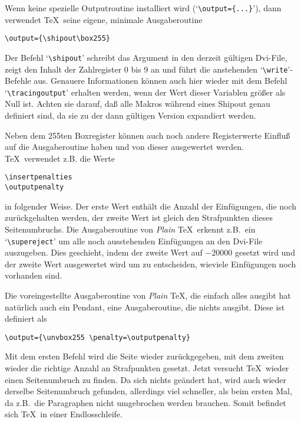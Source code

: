 Wenn keine spezielle Outputroutine installiert wird
(`\verb|\output={...}|'), dann verwendet \TeX\ seine eigene, minimale
Ausgaberoutine
\begin{verbatim}
\output={\shipout\box255}
\end{verbatim}
Der Befehl `\verb|\shipout|' schreibt das 
Argument in den derzeit
g\"ultigen Dvi-File, zeigt den Inhalt der Zahlregister 0 bis 9 an und
f\"uhrt die anstehenden
`\verb|\write|'-Befehle aus. Genauere
Informationen k\"onnen auch hier wieder mit dem Befehl
`\verb|\tracingoutput|' erhalten werden, wenn der Wert dieser
Variablen gr\"o\ss{}er als Null ist. Achten sie darauf, da\ss{} alle Makros
w\"ahrend eines Shipout genau definiert sind, da sie zu der dann
g\"ultigen Version expandiert werden.

Neben dem 255ten Boxregister k\"onnen auch noch andere Registerwerte
Einflu\ss{} auf die Ausgaberoutine haben und von dieser ausgewertet
werden. \TeX\ verwendet z.B. die Werte
\begin{verbatim}
\insertpenalties
\outputpenalty
\end{verbatim}
in folgender Weise. Der erste Wert enth\"alt die Anzahl der
Einf\"ugungen,
die noch zur\"uckgehalten werden, der zweite Wert ist gleich den
Strafpunkten dieses 
Seitenumbruchs. Die Ausgaberoutine von {\em Plain}
\TeX\ erkennt z.B.\ ein
`\verb|\supereject|' um alle noch ausstehenden
Einf\"ugungen an den Dvi-File auszugeben. Dies geschieht, indem der
zweite Wert auf $-20000$ gesetzt wird und der zweite Wert ausgewertet
wird um zu entscheiden, wieviele Einf\"ugungen noch vorhanden sind.

Die voreingestellte Ausgaberoutine von {\em Plain} \TeX, die einfach
alles ausgibt hat nat\"urlich auch ein Pendant, eine Ausgaberoutine, die
nichts ausgibt. Diese ist definiert als
\begin{verbatim}
\output={\unvbox255 \penalty=\outputpenalty}
\end{verbatim}
Mit dem ersten Befehl wird die Seite wieder zur\"uckgegeben, mit dem
zweiten wieder die richtige Anzahl an Strafpunkten gesetzt. Jetzt
versucht \TeX\ wieder einen 
Seitenumbruch zu finden. Da sich nichts
ge\"andert hat, wird auch wieder derselbe Seitenumbruch gefunden,
allerdings viel schneller, als beim ersten Mal, da z.B.\ die
Paragraphen nicht umgebrochen werden brauchen. Somit befindet sich
\TeX\ in einer Endlosschleife.

